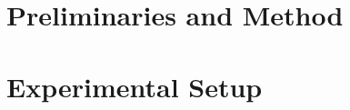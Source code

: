 \documentclass[letterpaper]{article}
\theoremstyle{plain}
\begin{document}
\section{Preliminaries and Method}
\label{sec:method}

\section{Experimental Setup}
\label{sec:setup}

\end{document}
